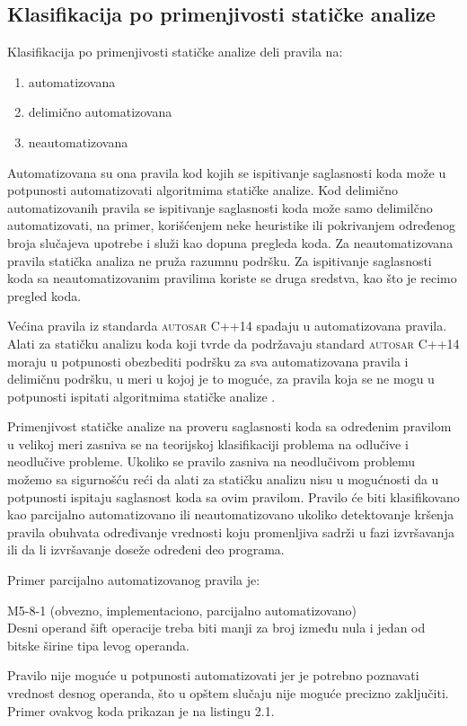 \documentclass[12pt,oneside]{memoir}
\begin{document}
\subsection{Klasifikacija po primenjivosti statičke analize}
Klasifikacija po primenjivosti statičke analize deli pravila na: 
\begin{enumerate}
  \item{automatizovana}
  \item{delimično automatizovana}
  \item{neautomatizovana}
\end{enumerate}
Automatizovana su ona pravila kod kojih se ispitivanje saglasnosti koda može u potpunosti automatizovati algoritmima statičke analize.
Kod delimično automatizovanih pravila se ispitivanje saglasnosti koda može samo delimilčno automatizovati, na primer, korišćenjem neke heuristike ili pokrivanjem određenog broja slučajeva upotrebe i služi kao dopuna pregleda koda.
Za neautomatizovana pravila statička analiza ne pruža razumnu podršku. Za ispitivanje saglasnosti koda sa neautomatizovanim pravilima koriste se druga sredstva, kao što je recimo pregled koda.

\indent
Većina pravila iz standarda \textsc{autosar} C++14 spadaju u automatizovana pravila. Alati za statičku analizu koda koji tvrde da podržavaju standard \textsc{autosar} C++14 moraju u potpunosti obezbediti podršku za sva automatizovana pravila i delimičnu podršku, u meri u kojoj je to moguće, za pravila koja se ne mogu u potpunosti ispitati algoritmima statičke analize \cite{AutosarGuidelines}.

\indent
Primenjivost statičke analize na proveru saglasnosti koda sa određenim pravilom u velikoj meri zasniva se na teorijskoj klasifikaciji problema
na odlučive i neodlučive probleme. Ukoliko se pravilo zasniva na neodlučivom problemu možemo sa sigurnošću reći da alati za statičku analizu nisu u mogućnosti da u potpunosti ispitaju saglasnost koda sa ovim pravilom. Pravilo će biti klasifikovano kao parcijalno automatizovano ili neautomatizovano ukoliko detektovanje kršenja pravila obuhvata određivanje vrednosti koju promenljiva sadrži u fazi izvr\v{s}avanja ili da li izvr\v{s}avanje doseže određeni deo programa.

Primer parcijalno automatizovanog pravila je: 

\begin{center}

\begin{tcolorbox}
 M5-8-1 (obvezno, implementaciono, parcijalno automatizovano) \\
Desni operand šift operacije treba biti manji za broj između nula i jedan
od bitske širine tipa levog operanda.

\end{tcolorbox}
\end{center}
  \noindent
  Pravilo nije moguće u potpunosti automatizovati jer je potrebno poznavati vrednost desnog operanda, što u opštem slučaju nije
  moguće precizno zaključiti. Primer ovakvog koda prikazan je na listingu 2.1. \\
\end{document}
